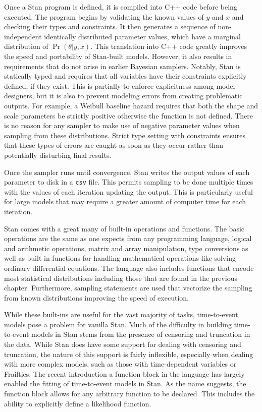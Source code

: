 Once a Stan program is defined, it is compiled into C++ code before being executed. The program begins by validating the known values of $y$ and $x$ and checking their types and constraints. It then generates a sequence of non-independent identically distributed parameter values, which have a marginal distribution of $\Pr(\theta|y,x)$. This translation into C++ code greatly improves the speed and portability of Stan-built models. However, it also results in requirements that do not arise in earlier Bayesian samplers. Notably, Stan is statically typed and requires that all variables have their constraints explicitly defined, if they exist. This is partially to enforce explicitness among model designers, but it is also to prevent modeling errors from creating problematic outputs. For example, a Weibull baseline hazard requires that both the shape and scale parameters be strictly positive otherwise the function is not defined. There is no reason for any sampler to make use of negative parameter values when sampling from these distributions. Strict type setting with constraints ensures that these types of errors are caught as soon as they occur rather than potentially disturbing final results. 

Once the sampler runs until convergence, Stan writes the output values of each parameter to disk in a \lstinline{csv} file. This permits sampling to be done multiple times with the values of each iteration updating the output. This is particularly useful for large models that may require a greater amount of computer time for each iteration.

Stan comes with a great many of built-in operations and functions. The basic operations are the same as one expects from any programming language, logical and arithmetic operations, matrix and array manipulation, type conversions as well as built in functions for handling mathematical operations like solving ordinary differential equations. The language also includes functions that encode most statistical distributions including those that are found in the previous chapter. Furthermore, sampling statements are used that vectorize the sampling from known distributions improving the speed of execution. 

While these built-ins are useful for the vast majority of tasks, time-to-event models pose a problem for vanilla Stan. Much of the difficulty in building time-to-event models in Stan stems from the presence of censoring and truncation in the data. While Stan does have some support for dealing with censoring and truncation, the nature of this support is fairly inflexible, especially when dealing with more complex models, such as those with time-dependent variables or Frailties. The recent introduction a function block in the language has largely enabled the fitting of time-to-event models in Stan. As the name suggests, the function block allows for any arbitrary function to be declared. This includes the ability to explicitly define a likelihood function.

